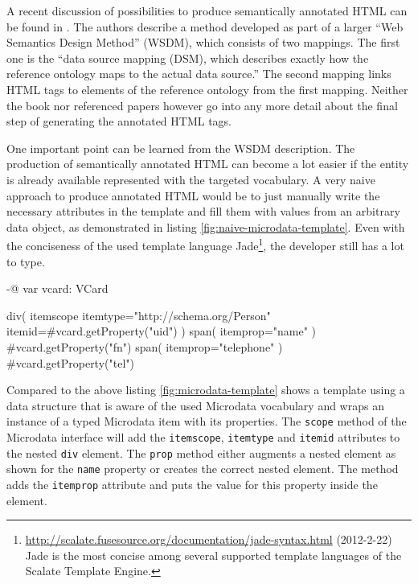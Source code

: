 \documentclass[11pt,a4paper,headsepline,twoside]{scrartcl}		%
\newcommand{\citeurl}[2]{\url{#1} (#2)}
\begin{document}


A recent discussion of possibilities to produce semantically annotated HTML can
be found in \cite[sec. 9.1.3]{DBLP:books/daglib/0023755}. The authors describe a
method developed as part of a larger ``Web Semantics Design Method'' (WSDM),
which consists of two mappings. The first one is the ``data source mapping
(DSM), which describes exactly how the reference ontology maps to the actual
data source.''  The second mapping links HTML tags to elements of the reference
ontology from the first mapping. Neither the book nor referenced papers however
go into any more detail about the final step of generating the annotated HTML
tags.

One important point can be learned from the WSDM description. The production of
semantically annotated HTML can become a lot easier if the entity is already
available represented with the targeted vocabulary. A very naive approach to
produce annotated HTML would be to just manually write the necessary attributes
in the template and fill them with values from an arbitrary data object, as
demonstrated in listing \ref{fig:naive-microdata-template}. Even with the
conciseness of the used template language
Jade\footnote{\citeurl{http://scalate.fusesource.org/documentation/jade-syntax.html}{2012-2-22}
  Jade is the most concise among several supported template languages of the
  Scalate Template Engine.}, the developer still has a lot to type.

\begin{anylisting}[label=fig:naive-microdata-template,
                   caption={Defining all Microdata attributes manually in an HTML template}]
-@ var vcard: VCard

div( itemscope itemtype="http://schema.org/Person" 
     itemid=#{vcard.getProperty("uid")} )
  span( itemprop="name" )
    #{vcard.getProperty("fn")}
  span( itemprop="telephone" ) 
    #{vcard.getProperty("tel")}
\end{anylisting}

Compared to the above listing \ref{fig:microdata-template} shows a template
using a data structure that is aware of the used Microdata vocabulary and wraps
an instance of a typed Microdata item with its properties. The
\lstinline:scope: method of the Microdata interface will add the
\lstinline:itemscope:, \lstinline:itemtype: and \lstinline:itemid: attributes to
the nested \lstinline:div: element. The \lstinline:prop: method either augments
a nested element as shown for the \lstinline:name: property or creates the
correct nested element. The method adds the \lstinline:itemprop: attribute and
puts the value for this property inside the element.
\end{document}
